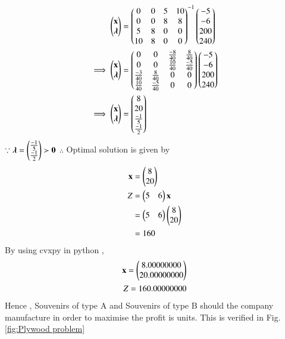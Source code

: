 \begin{align}
    \begin{pmatrix}\mathbf{x} \\ \boldsymbol{\lambda}\end{pmatrix} &= \begin{pmatrix}0 & 0 & 5 & 10 \\ 0 & 0 & 8 & 8 \\ 5 & 8 & 0 & 0 \\ 10 & 8 & 0 & 0\end{pmatrix}^{-1}\begin{pmatrix}-5 \\ -6 \\ 200 \\ 240\end{pmatrix}
    \\
    \implies   \begin{pmatrix}\mathbf{x} \\ \boldsymbol{\lambda}\end{pmatrix} &= \begin{pmatrix}0 & 0 & \frac{-8}{40} & \frac{8}{40} \\ 0 & 0 & \frac{10}{40} & \frac{-5}{40} \\ \frac{-3}{40} & \frac{8}{40} & 0 & 0 \\ \frac{10}{40} & \frac{-5}{40} & 0 & 0\end{pmatrix}\begin{pmatrix}-5 \\ -6 \\ 200 \\ 240\end{pmatrix}
    \\
    \implies \begin{pmatrix}\mathbf{x} \\ \boldsymbol{\lambda}\end{pmatrix} &= \begin{pmatrix}8 \\ 20 \\ \frac{-1}{5} \\ \frac{-1}{2} \end{pmatrix}
\end{align}
$\because \boldsymbol{\lambda}=\begin{pmatrix}\frac{-1}{5} \\ \frac{-1}{2}\end{pmatrix} \succ \mathbf{0} $ 
$\therefore$ Optimal solution is given by
\begin{align}
    \mathbf{x} &= \begin{pmatrix}8\\20\end{pmatrix} \\
    Z &= \begin{pmatrix}5 & 6\end{pmatrix}\mathbf{x} \\
    &= \begin{pmatrix}5 & 6\end{pmatrix}\begin{pmatrix}8 \\ 20\end{pmatrix} \\
    &= 160
\end{align}
By using cvxpy in python ,
\begin{align}
    \mathbf{x}=\begin{pmatrix}8.00000000\\20.00000000\end{pmatrix}\\
    Z = 160.00000000
\end{align}
Hence , Souvenirs of type A and  Souvenirs of type B should the company manufacture in order to maximise the profit is  units.  This is verified in Fig. \ref{fig:Plywood problem}	


